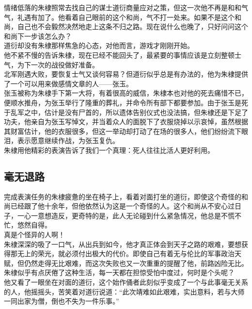 \begin{multicols}{\theparacolNo}
情绪低落的朱棣照常去找自己的谋士道衍商量应对之策，但这一次他不再是和和气气，礼遇有加了。他看着自己眼前的这个和尚，气不打一处来。如果不是这个和尚，自己也不会毅然决然地走上这条不归之路。现在说什么也晚了，只好问问这个和尚下一步该怎么办？\\

道衍却没有朱棣那样焦急的心态，对他而言，游戏才刚刚开始。\\

他不紧不慢的告诉朱棣，现在已经不能回头了，最紧要的事情应该是立刻整顿士气，为下一次的战役做好准备。\\

北军刚遇大败，要恢复士气又谈何容易？但道衍似乎总是有办法的，他为朱棣提供了一个可以用来做感情文章的人——张玉。\\

张玉被称为朱棣手下第一大将，有着很高的威信，朱棣本也对他的死去痛惜不已，便顺水推舟，为张玉举行了隆重的葬礼，并命令所有部下都要参加。由于张玉是死于乱军之中，估计是没有尸首的，所以遗体告别仪式也没法搞，但朱棣还是下足了功夫，他亲自为张玉写悼文，并当着众人的面脱下了衣服烧掉以示哀悼，虽然根据其财富估计，他的衣服很多，但这一举动却打动了在场的很多人，他们纷纷流下眼泪，表示愿意继续作战，为张玉复仇。\\

朱棣用他精彩的表演告诉了我们一个真理：死人往往比活人更好利用。\\

\subsection{毫无退路}
完成表演任务的朱棣疲惫的坐在椅子上，看着对面打坐的道衍，即使这个奇怪的和尚已经跟了他十余年，但他依然认为这是一个奇怪的人。这个和尚从不安心过日子，一心一意想造反，更奇特的是，此人无论碰到什么紧急情况，他总是不慌不忙，悠然自得。\\

真是个怪异的人啊！\\

朱棣深深的吸了一口气，从出兵到如今，他才真正体会到天子之路的艰难，要想获得那无上的荣光，就必须付出极大的代价。即使自己有着无与伦比的军事政治天赋，但仍然走得无比艰难，而这次失败也又一次重重的提醒了他，前路凶险无比。\\

朱棣似乎有点厌倦了这种生活，每一天都在担惊受怕中度过，何时是个头呢？\\

他又看了一眼坐在对面的道衍，这个始作俑者此刻似乎变成了一个与此事毫无关系的人，他摇摇头，苦笑着对道衍说道：“此次靖难如此艰难，实出意料，若与大师一同出家为僧，倒也不失为一件乐事。”\\


\end{multicols}
